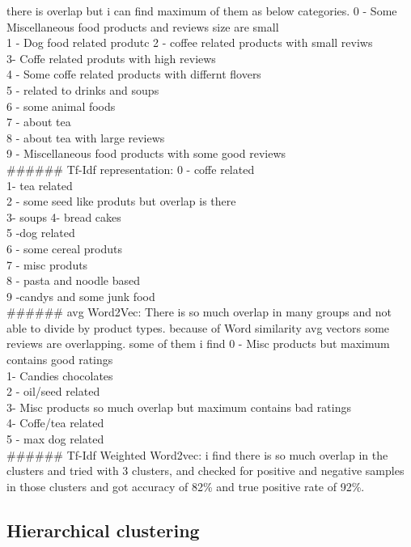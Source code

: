 \documentclass[11pt]{article}
\begin{document}
there is overlap but i can find maximum of them as below categories. 0 -
Some Miscellaneous food products and reviews size are small\\
1 - Dog food related produtc 2 - coffee related products with small
reviws\\
3- Coffe related produts with high reviews\\
4 - Some coffe related products with differnt flovers\\
5 - related to drinks and soups\\
6 - some animal foods\\
7 - about tea\\
8 - about tea with large reviews\\
9 - Miscellaneous food products with some good reviews\\
\#\#\#\#\#\# Tf-Idf representation: 0 - coffe related\\
1- tea related\\
2 - some seed like produts but overlap is there\\
3- soups 4- bread cakes\\
5 -dog related\\
6 - some cereal produts\\
7 - misc produts\\
8 - pasta and noodle based\\
9 -candys and some junk food\\
\#\#\#\#\#\# avg Word2Vec: There is so much overlap in many groups and
not able to divide by product types. because of Word similarity avg
vectors some reviews are overlapping. some of them i find 0 - Misc
products but maximum contains good ratings\\
1- Candies chocolates\\
2 - oil/seed related\\
3- Misc products so much overlap but maximum contains bad ratings\\
4- Coffe/tea related\\
5 - max dog related\\
\#\#\#\#\#\# Tf-Idf Weighted Word2vec: i find there is so much overlap
in the clusters and tried with 3 clusters, and checked for positive and
negative samples in those clusters and got accuracy of 82\% and true
positive rate of 92\%.

    \subsection{Hierarchical clustering}\label{hierarchical-clustering}
\end{document}
